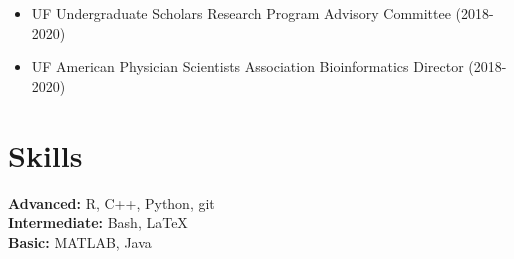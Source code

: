 \documentclass[margin,centered]{res}
\newenvironment{list1}{
  \begin{list}{\ding{113}}{%
      \setlength{\itemsep}{0in}
      \setlength{\parsep}{0in} \setlength{\parskip}{0in}
      \setlength{\topsep}{0in} \setlength{\partopsep}{0in}
      \setlength{\leftmargin}{0.17in}}}{\end{list}}
\newenvironment{list2}{
  \begin{list}{$\bullet$}{%
      \setlength{\itemsep}{0in}
      \setlength{\parsep}{0in} \setlength{\parskip}{0in}
      \setlength{\topsep}{0in} \setlength{\partopsep}{0in}
      \setlength{\leftmargin}{0.2in}}}{\end{list}}
\begin{document}
\begin{resume}
\begin{itemize}
\item UF Undergraduate Scholars Research Program Advisory Committee (2018-2020)
\item UF American Physician Scientists Association Bioinformatics Director (2018-2020)
\end{itemize}

\section{\sc Skills}
{\bf Advanced:} R, C++, Python, git\\
{\bf Intermediate:} Bash, LaTeX\\
{\bf Basic:} MATLAB, Java






%
\thispagestyle{lastpage}
\end{resume}
\end{document}
